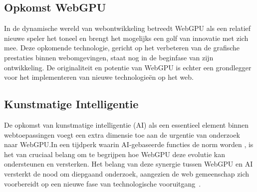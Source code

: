 





\subsection{Opkomst WebGPU}
In de dynamische wereld van webontwikkeling betreedt WebGPU als een relatief nieuwe speler het toneel en brengt het mogelijks een golf van innovatie met zich mee. Deze opkomende technologie, gericht op het verbeteren van de grafische prestaties binnen webomgevingen, staat nog in de beginfase van zijn ontwikkeling. De originaliteit en potentie van WebGPU is echter een grondlegger voor het implementeren van nieuwe technologieën op het web.

\subsection{Kunstmatige Intelligentie}
De opkomst van kunstmatige intelligentie (AI) als een essentieel element binnen webtoepassingen voegt een extra dimensie toe aan de urgentie van onderzoek naar WebGPU.\@ In een tijdperk waarin AI-gebaseerde functies de norm worden \textcite{QuantumBlack2022}, is het van cruciaal belang om te begrijpen hoe WebGPU deze evolutie kan ondersteunen en versterken. Het belang van deze synergie tussen WebGPU en AI versterkt de nood om diepgaand onderzoek, aangezien de web gemeenschap zich voorbereidt op een nieuwe fase van technologische vooruitgang~\autocite{Gu2023}.

